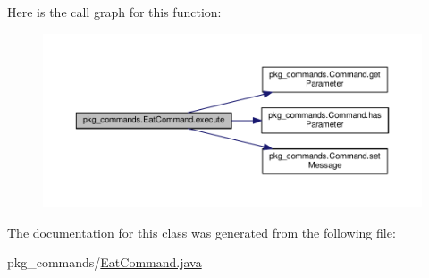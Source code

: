 Here is the call graph for this function\-:
\nopagebreak
\begin{figure}[H]
\begin{center}
\leavevmode
\includegraphics[width=350pt]{classpkg__commands_1_1EatCommand_a2a600f09891aa076b3f630293de965f4_cgraph}
\end{center}
\end{figure}




The documentation for this class was generated from the following file\-:\begin{DoxyCompactItemize}
\item 
pkg\-\_\-commands/\hyperlink{EatCommand_8java}{Eat\-Command.\-java}\end{DoxyCompactItemize}
